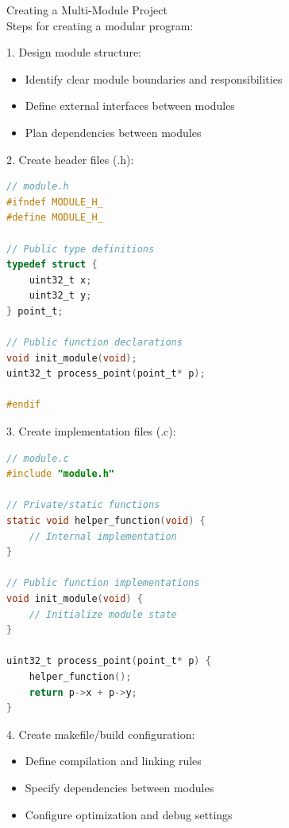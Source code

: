 \begin{KR}{Creating a Multi-Module Project}\\
Steps for creating a modular program:

1. Design module structure:
\begin{itemize}
  \item Identify clear module boundaries and responsibilities 
  \item Define external interfaces between modules
  \item Plan dependencies between modules
\end{itemize}

2. Create header files (.h):
\begin{lstlisting}[language=C, style=basesmol]
// module.h
#ifndef MODULE_H_
#define MODULE_H_ 

// Public type definitions
typedef struct {
    uint32_t x;
    uint32_t y;
} point_t;

// Public function declarations
void init_module(void);
uint32_t process_point(point_t* p);

#endif
\end{lstlisting}

3. Create implementation files (.c):
\begin{lstlisting}[language=C, style=basesmol]
// module.c
#include "module.h"

// Private/static functions
static void helper_function(void) {
    // Internal implementation
}

// Public function implementations
void init_module(void) {
    // Initialize module state
}

uint32_t process_point(point_t* p) {
    helper_function();
    return p->x + p->y;
}
\end{lstlisting}

4. Create makefile/build configuration:
\begin{itemize}
  \item Define compilation and linking rules
  \item Specify dependencies between modules
  \item Configure optimization and debug settings
\end{itemize}
\end{KR}




